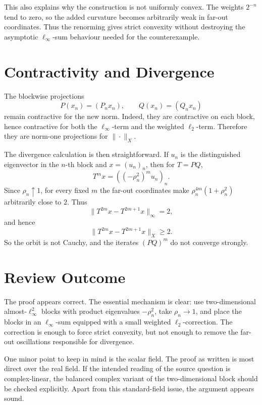 \documentclass[11pt]{article}
\begin{document}
This also explains why the construction is not uniformly convex.  The weights
\(2^{-n}\) tend to zero, so the added curvature becomes arbitrarily weak in
far-out coordinates.  Thus the renorming gives strict convexity without
destroying the asymptotic \(\ell_\infty\)-sum behaviour needed for the
counterexample.

\section*{Contractivity and Divergence}

The blockwise projections
\[
  P(x_n)=(P_nx_n),
  \qquad
  Q(x_n)=(Q_nx_n)
\]
remain contractive for the new norm.  Indeed, they are contractive on each
block, hence contractive for both the \(\ell_\infty\)-term and the weighted
\(\ell_2\)-term.  Therefore they are norm-one projections for
\(\|\cdot\|_X\).

The divergence calculation is then straightforward.  If \(u_n\) is the
distinguished eigenvector in the \(n\)-th block and \(x=(u_n)_n\), then for
\(T=PQ\),
\[
  T^m x
  =
  \left((-\rho_n^2)^m u_n\right)_n.
\]
Since \(\rho_n\uparrow 1\), for every fixed \(m\) the far-out coordinates make
\(\rho_n^{4m}(1+\rho_n^2)\) arbitrarily close to \(2\).  Thus
\[
  \|T^{2m}x-T^{2m+1}x\|_\infty=2,
\]
and hence
\[
  \|T^{2m}x-T^{2m+1}x\|_X\geq 2.
\]
So the orbit is not Cauchy, and the iterates \((PQ)^m\) do not converge
strongly.

\section*{Review Outcome}

The proof appears correct.  The essential mechanism is clear: use
two-dimensional almost-\(\ell_\infty^2\) blocks with product eigenvalues
\(-\rho_n^2\), take \(\rho_n\to1\), and place the blocks in an
\(\ell_\infty\)-sum equipped with a small weighted \(\ell_2\)-correction.  The
correction is enough to force strict convexity, but not enough to remove the
far-out oscillations responsible for divergence.

One minor point to keep in mind is the scalar field.  The proof as written is
most direct over the real field.  If the intended reading of the source
question is complex-linear, the balanced complex variant of the two-dimensional
block should be checked explicitly.  Apart from this standard-field issue, the
argument appears sound.
\end{document}
